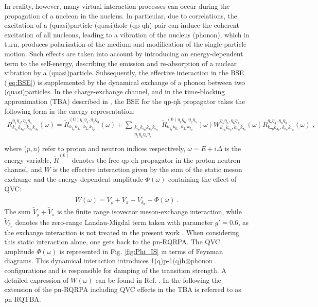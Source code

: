\documentclass{PoS}
\begin{document}
In reality, however, many virtual interaction processes can occur during the propagation of a nucleon in the nucleus. In particular, due to correlations, the excitation of a (quasi)particle-(quasi)hole (qp-qh) pair can induce the coherent excitation of all nucleons, leading to a vibration of the nucleus (phonon), which in turn, produces polarization of the medium and modification of the single-particle motion.
Such effects are taken into account by introducing an energy-dependent term to the self-energy, describing the emission and re-absorption of a nuclear vibration by a (quasi)particle.
Subsequently, the effective interaction in the BSE (\ref{eq:BSE}) is supplemented by the dynamical exchange of a phonon between two (quasi)particles.
In the charge-exchange channel, and in the time-blocking approximation (TBA) described in \cite{TBA,Litvinova2008}, the BSE for the qp-qh propagator takes the following form in the energy representation:
\begin{eqnarray}
R^{\eta_1 \eta_4 , \eta_2 \eta_3}_{k_{1_p} k_{4_n}, k_{2_n} k_{3_p}} (\omega) = \widetilde{R}^{(0) \eta_1 \eta_4 , \eta_2 \eta_3}_{k_{1_p} k_{4_n}, k_{2_n} k_{3_p}} (\omega)
+ \sum_{\substack{k_{5_p} k_{6_n} k_{7_p} k_{8_n} \\ \eta_5 \eta_6 \eta_7 \eta_8}} \widetilde{R}^{(0) \eta_1 \eta_6 , \eta_2 \eta_5}_{k_{1_p} k_{6_n}, k_{2_n} k_{5_p}} (\omega) 
W^{\eta_5 \eta_8 , \eta_6 \eta_7}_{k_{5_p} k_{8_n}, k_{6_n} k_{7_p}} (\omega) R^{\eta_7 \eta_4 , \eta_8 \eta_3}_{k_{7p} k_{4_n}, k_{8_n} k_{3_p}} (\omega) \; , \nonumber \\ \label{eq:BSE_pn}
\end{eqnarray}
where ($p,n$) refer to proton and neutron indices respectively, $\omega = E+i\Delta$ is the energy variable, $\widetilde{R}^{(0)}$ denotes the free qp-qh propagator in the proton-neutron channel, and $W$ is the effective interaction given by the sum of the static meson exchange and the energy-dependent amplitude $\Phi(\omega)$ containing the effect of QVC:
\begin{eqnarray}
W(\omega) = \widetilde V_\rho  + \widetilde V_\pi + \widetilde V_{\delta_{\pi}} +  \Phi(\omega)\; .
\label{eq:int}
\end{eqnarray}
\noindent The sum $\widetilde V_\rho  + \widetilde V_\pi$ is the finite range isovector meson-exchange interaction, while $\widetilde V_{\delta_{\pi}}$ denotes the zero-range Landau-Migdal term taken with parameter $g'=0.6$, as the exchange interaction is not treated in the present work \cite{Liang}. When considering this static interaction alone, one gets back to the pn-RQRPA.
The QVC amplitude $\Phi(\omega)$ is represented in Fig. \ref{fig:Phi_IS} in terms of Feynman diagrams. This dynamical interaction introduces 1(q)p-1(q)h$\otimes$phonon configurations and is responsible for damping of the transition strength.
A detailed expression of $W(\omega)$ can be found in Ref. \cite{Robin}.
In the following the extension of the pn-RQRPA including QVC effects in the TBA is referred to as pn-RQTBA.
\end{document}
